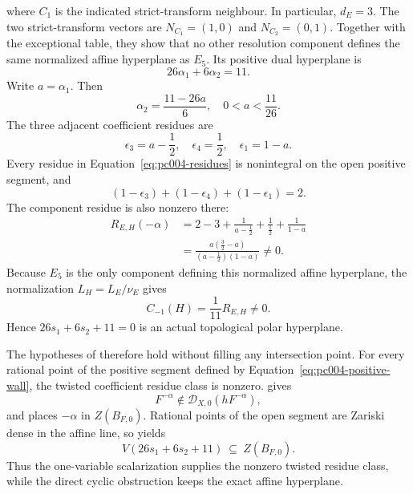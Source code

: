 \documentclass[12pt]{amsart}
\numberwithin{equation}{section}
\theoremstyle{plain}
\theoremstyle{definition}
\theoremstyle{remark}
\theoremstyle{definition}
\newcommand{\D}{\mathscr D}
\begin{document}
where $C_1$ is the indicated strict-transform neighbour. In particular, $d_E=3$. The two strict-transform vectors are $N_{C_1}=(1,0)$ and $N_{C_2}=(0,1)$. Together with the exceptional table, they show that no other resolution component defines the same normalized affine hyperplane as $E_5$. Its positive dual hyperplane is
\begin{equation}\label{eq:pc004-positive-wall}
 26\alpha_1+6\alpha_2=11.
\end{equation}
Write $a=\alpha_1$. Then
\begin{equation*}
\alpha_2=\frac{11-26a}{6},
 \quad
 0<a<\frac{11}{26}.
\end{equation*}
The three adjacent coefficient residues are
\begin{equation}\label{eq:pc004-residues}
 \epsilon_3=a-\frac12,
 \quad
 \epsilon_4=\frac12,
 \quad
 \epsilon_1=1-a.
\end{equation}
Every residue in Equation~\eqref{eq:pc004-residues} is nonintegral on the open positive segment, and
\begin{equation*}
(1-\epsilon_3)+(1-\epsilon_4)+(1-\epsilon_1)=2.
\end{equation*}
The component residue is also nonzero there:
\begin{equation*}
\begin{aligned}
 R_{E,H}(-\alpha)
 &=
 2-3+\frac1{a-\frac12}+\frac1{\frac12}+\frac1{1-a}\\
 &=
 \frac{a(\frac32-a)}
 {(a-\frac12)(1-a)}
 \neq0.
 \end{aligned}
\end{equation*}
Because $E_5$ is the only component defining this normalized affine hyperplane, the normalization $L_H=L_E/\nu_E$ gives
\begin{equation*}
C_{-1}(H)=\frac1{11}R_{E,H}\neq0.
\end{equation*}
Hence $26s_1+6s_2+11=0$ is an actual topological polar hyperplane.

The hypotheses of  therefore hold without filling any intersection point. For every rational point of the positive segment defined by Equation~\eqref{eq:pc004-positive-wall}, the twisted coefficient residue class is nonzero.  gives
\begin{equation*}
F^{-\alpha}\notin\D_{X,0}(hF^{-\alpha}),
\end{equation*}
and  places $-\alpha$ in $Z(B_{F,0})$. Rational points of the open segment are Zariski dense in the affine line, so  yields
\begin{equation*}
V(26s_1+6s_2+11)
 \ \subseteq\
 Z(B_{F,0}).
\end{equation*}
Thus the one-variable scalarization supplies the nonzero twisted residue class, while the direct cyclic obstruction keeps the exact affine hyperplane.
\end{document}
